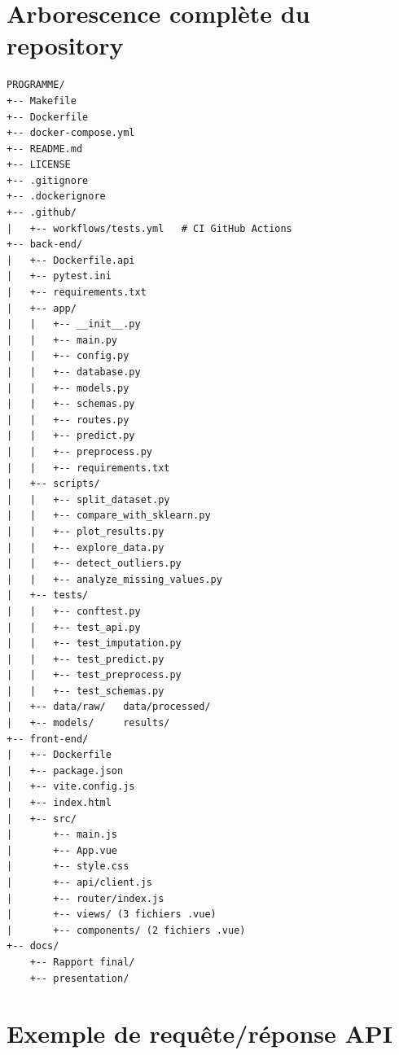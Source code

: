 \documentclass[12pt,a4paper,openany]{report}
\begin{document}
\cleardoublepage
{}
{}



\appendix

\chapter{Arborescence complète du repository}

\begin{small}
\begin{verbatim}
PROGRAMME/
+-- Makefile
+-- Dockerfile
+-- docker-compose.yml
+-- README.md
+-- LICENSE
+-- .gitignore
+-- .dockerignore
+-- .github/
|   +-- workflows/tests.yml   # CI GitHub Actions
+-- back-end/
|   +-- Dockerfile.api
|   +-- pytest.ini
|   +-- requirements.txt
|   +-- app/
|   |   +-- __init__.py
|   |   +-- main.py
|   |   +-- config.py
|   |   +-- database.py
|   |   +-- models.py
|   |   +-- schemas.py
|   |   +-- routes.py
|   |   +-- predict.py
|   |   +-- preprocess.py
|   |   +-- requirements.txt
|   +-- scripts/
|   |   +-- split_dataset.py
|   |   +-- compare_with_sklearn.py
|   |   +-- plot_results.py
|   |   +-- explore_data.py
|   |   +-- detect_outliers.py
|   |   +-- analyze_missing_values.py
|   +-- tests/
|   |   +-- conftest.py
|   |   +-- test_api.py
|   |   +-- test_imputation.py
|   |   +-- test_predict.py
|   |   +-- test_preprocess.py
|   |   +-- test_schemas.py
|   +-- data/raw/   data/processed/
|   +-- models/     results/
+-- front-end/
|   +-- Dockerfile
|   +-- package.json
|   +-- vite.config.js
|   +-- index.html
|   +-- src/
|       +-- main.js
|       +-- App.vue
|       +-- style.css
|       +-- api/client.js
|       +-- router/index.js
|       +-- views/ (3 fichiers .vue)
|       +-- components/ (2 fichiers .vue)
+-- docs/
    +-- Rapport final/
    +-- presentation/
\end{verbatim}
\end{small}

\chapter{Exemple de requête/réponse API}
\end{document}
